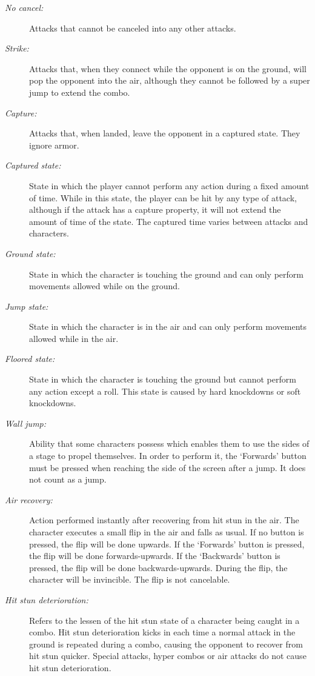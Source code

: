 \documentclass{article}
\begin{document}
\begin{flushleft}
\begin{description}
\item[\textit{No cancel:}] Attacks that cannot be canceled into any other attacks.
\item[\textit{Strike:}] Attacks that, when they connect while the opponent is on the ground, will pop the opponent into the air, although they cannot be followed by a super jump to extend the combo.
\item[\textit{Capture:}] Attacks that, when landed, leave the opponent in a captured state. They ignore armor.
\item[\textit{Captured state:}] State in which the player cannot perform any action during a fixed amount of time. While in this state, the player can be hit by any type of attack, although if the attack has a capture property, it will not extend the amount of time of the state. The captured time varies between attacks and characters.
\item[\textit{Ground state:}] State in which the character is touching the ground and can only perform movements allowed while on the ground.
\item[\textit{Jump state:}] State in which the character is in the air and can only perform movements allowed while in the air.
\item[\textit{Floored state:}] State in which the character is touching the ground but cannot perform any action except a roll. This state is caused by hard knockdowns or soft knockdowns.
\item[\textit{Wall jump:}] Ability that some characters possess which enables them to use the sides of a stage to propel themselves. In order to perform it, the `Forwards' button must be pressed when reaching the side of the screen after a jump. It does not count as a jump.
\item[\textit{Air recovery:}] Action performed instantly after recovering from hit stun in the air. The character executes a small flip in the air and falls as usual. If no button is pressed, the flip will be done upwards. If the `Forwards' button is pressed, the flip will be done forwards-upwards. If the `Backwards' button is pressed, the flip will be done backwards-upwards. During the flip, the character will be invincible. The flip is not cancelable.
\item[\textit{Hit stun deterioration:}] Refers to the lessen of the hit stun state of a character being caught in a combo. Hit stun deterioration kicks in each time a normal attack in the ground is repeated during a combo, causing the opponent to recover from hit stun quicker. Special attacks, hyper combos or air attacks do not cause hit stun deterioration.

\end{description}
\end{flushleft}
\end{document}
